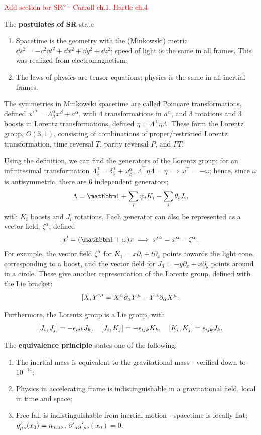 \documentclass{article}
\begin{document}
\textcolor{red}{Add section for SR? - Carroll ch.1, Hartle ch.4}

The \textbf{postulates of SR} state
\begin{enumerate}
    \item Spacetime is the geometry with the (Minkowski) metric $\dd s^2=-c^2\dd t^2+\dd x^2+\dd y^2+\dd z^2$; speed of light is the same in all frames. This was realized from electromagnetism.
    \item The laws of physics are tensor equations; physics is the same in all inertial frames.
\end{enumerate}

The symmetries in Minkowski spacetime are called Poincare transformations, defined $x'^\alpha=\Lambda^\alpha_\beta x^\beta+a^\alpha$, with 4 transformations in $a^\alpha$, and 3 rotations and 3 boosts in Lorentz transformations, defined $\eta=\Lambda^\intercal\eta\Lambda$. These form the Lorentz group, $O(3,1)$, consisting of combinations of proper/restricted Lorentz transformation, time reversal $T$, parity reversal $P$, and $PT$. 

Using the definition, we can find the generators of the Lorentz group: for an infinitesimal transformation $\Lambda^\alpha_\beta=\delta^\alpha_\beta+\omega^\alpha_\beta$, $\Lambda^\intercal\eta\Lambda=\eta\implies\omega^\intercal=-\omega$; hence, since $\omega$ is antisymmetric, there are 6 independent generators; 
$$\Lambda=\mathbbm 1+\sum_i\psi_iK_i+\sum_i\theta_iJ_i,$$
with $K_i$ boosts and $J_i$ rotations. Each generator can also be represented as a vector field, $\zeta^\alpha$, defined
$$x'=(\mathbbm 1+\omega)x\implies x'^\alpha=x^\alpha-\zeta^\alpha.$$
For example, the vector field $\zeta^\alpha$ for $K_1=x\partial_t+t\partial_x$ points towards the light cone, corresponding to a boost, and the vector field for $J_3=-y\partial_x+x\partial_y$ points around in a circle. These give another representation of the Lorentz group, defined with the Lie bracket:
$$\comm{X}{Y}^\mu=X^\alpha\partial_\alpha Y^\mu-Y^\alpha\partial_\alpha X^\mu.$$


Furthermore, the Lorentz group is a Lie group, with 
$$\comm{J_i}{J_j}=-\epsilon_{ijk}J_k,\quad\comm{J_i}{K_j}=-\epsilon_{ijk}K_k,\quad\comm{K_i}{K_j}=\epsilon_{ijk}J_k.$$

The \textbf{equivalence principle} states one of the following:
\begin{enumerate}
    \item The inertial mass is equivalent to the gravitational mass - verified down to $10^{-14}$;
    \item Physics in accelerating frame is indistinguishable in a gravitational field, local in time and space;
    \item Free fall is indistinguishable from inertial motion - spacetime is locally flat; $g'_{\mu\nu}(x_0)=\eta_{\\mu\nu}$, $\partial'_\alpha g'_{\mu\nu}(x_0)=0$.
\end{enumerate}
\end{document}
